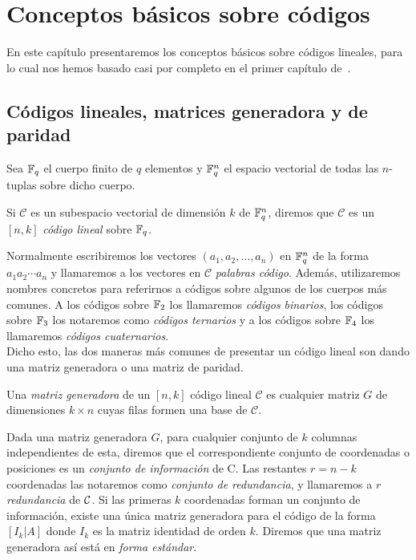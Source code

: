 \chapter{Conceptos básicos sobre códigos}%
\label{chap:conceptos_básicos_sobre_códigos}

En este capítulo presentaremos los conceptos básicos sobre códigos lineales, para lo cual nos hemos basado casi por completo en el primer capítulo de~\cite{foecc}.

\section{Códigos lineales, matrices generadora y de paridad}%
\label{sec:códigos_lineales_matrices_generadora_y_de_paridad}

Sea \(\mathbb{F}_q\) el cuerpo finito de \(q\) elementos y \(\mathbb{F}_q^n\) el espacio vectorial de todas las \(n\)-tuplas sobre dicho cuerpo.

\begin{definition}
Si \(\mathcal{C}\) es un subespacio vectorial de dimensión \(k\) de \(\mathbb{F}_q^n\), diremos que \(\mathcal{C}\) es un \([n,k]\) \textit{código lineal} sobre \(\mathbb{F}_q\).
\end{definition}

Normalmente escribiremos los vectores \((a_1, a_2, \dots, a_n)\) en \(\mathbb{F}_q^n\) de la forma \(a_1 a_2 \cdots a_n\) y llamaremos a los vectores en \(\mathcal{C}\) \textit{palabras código}. Además, utilizaremos nombres concretos para referirnos a códigos sobre algunos de los cuerpos más comunes. A los códigos sobre \(\mathbb{F}_2\) los llamaremos \textit{códigos binarios}, los códigos sobre \(\mathbb{F}_3\) los notaremos como \textit{códigos ternarios} y a los códigos sobre \(\mathbb{F}_4\) los llamaremos \textit{códigos cuaternarios}.\\

Dicho esto, las dos maneras más comunes de presentar un código lineal son dando una matriz generadora o una matriz de paridad.

\begin{definition}
    Una \textit{matriz generadora} de un \([n,k]\) código lineal \(\mathcal{C}\) es cualquier matriz \(G\) de dimensiones \(k \times n\) cuyas filas formen una base de \(\mathcal{C}\).
\end{definition}

Dada una matriz generadora \(G\), para cualquier conjunto de \(k\) columnas independientes de esta, diremos que el correspondiente conjunto de coordenadas o posiciones es un \textit{conjunto de información} de C. Las restantes \(r=n-k\) coordenadas las notaremos como \textit{conjunto de redundancia}, y llamaremos a \(r\) \textit{redundancia} de \(\mathcal{C}\). Si las primeras \(k\) coordenadas forman un conjunto de información, existe una única matriz generadora para el código de la forma \([I_k | A]\) donde \(I_k\) es la matriz identidad de orden \(k\). Diremos que una matriz generadora así está en \textit{forma estándar}.

